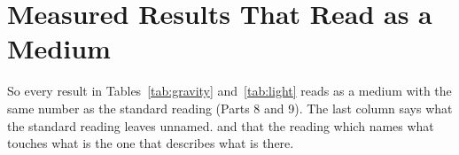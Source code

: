 \documentclass[11pt,a4paper]{article}
\begin{document}
\section{Measured Results That Read as a Medium}\label{sec:measured}

 So every result in Tables~\ref{tab:gravity} and~\ref{tab:light} reads as a medium with the same number as the standard reading (Parts 8 and 9).\nocite{hamilton2008} The last column says what the standard reading leaves unnamed.  and that the reading which names what touches what is the one that describes what is there.
\end{document}
